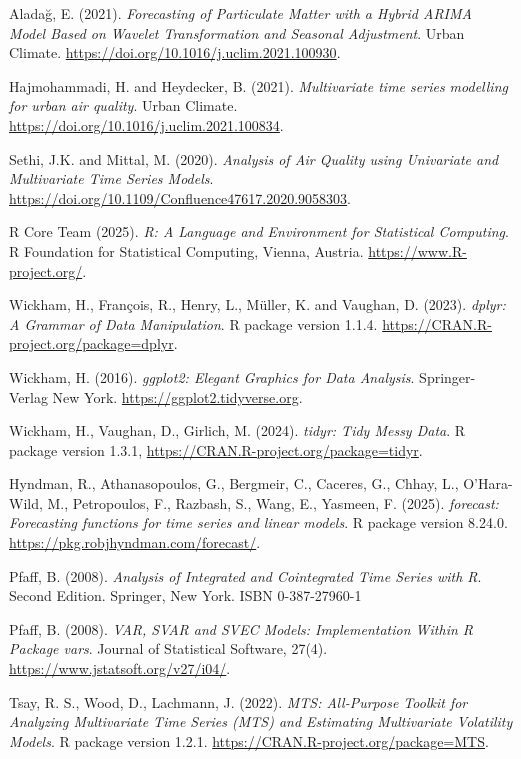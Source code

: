 \documentclass[fleqn,10pt]{SelfArx} %
\begin{document}
\begin{thebibliography}{9}

Aladağ, E. (2021). \textit{Forecasting of Particulate Matter with a Hybrid ARIMA Model Based on Wavelet Transformation and Seasonal Adjustment}. Urban Climate. \url{https://doi.org/10.1016/j.uclim.2021.100930}.

Hajmohammadi, H. and Heydecker, B. (2021). \textit{Multivariate time series modelling for urban air quality}. Urban Climate. \url{https://doi.org/10.1016/j.uclim.2021.100834}.

Sethi, J.K. and Mittal, M. (2020). \textit{Analysis of Air Quality using Univariate and Multivariate Time Series Models}. \url{https://doi.org/10.1109/Confluence47617.2020.9058303}.

R Core Team (2025). \textit{R: A Language and Environment for Statistical Computing}. R Foundation for Statistical Computing, Vienna, Austria. \url{https://www.R-project.org/}.

Wickham, H., François, R., Henry, L., Müller, K. and Vaughan, D. (2023). \textit{dplyr: A Grammar of Data Manipulation}. R package version 1.1.4. \url{https://CRAN.R-project.org/package=dplyr}.

Wickham, H. (2016). \textit{ggplot2: Elegant Graphics for Data Analysis}. Springer-Verlag New York. \url{https://ggplot2.tidyverse.org}.

Wickham, H., Vaughan, D., Girlich, M. (2024). \textit{tidyr: Tidy Messy Data}. R package version 1.3.1, \url{https://CRAN.R-project.org/package=tidyr}.

Hyndman, R., Athanasopoulos, G., Bergmeir, C., Caceres, G., Chhay, L., O'Hara-Wild, M., Petropoulos, F., Razbash, S., Wang, E., Yasmeen, F. (2025). \textit{forecast: Forecasting functions for time series and linear models}. R package version 8.24.0. \url{https://pkg.robjhyndman.com/forecast/}.

Pfaff, B. (2008). \textit{Analysis of Integrated and Cointegrated Time Series with R}. Second Edition. Springer, New York. ISBN 0-387-27960-1

Pfaff, B. (2008). \textit{VAR, SVAR and SVEC Models: Implementation Within R Package vars}. Journal of Statistical Software, 27(4). \url{https://www.jstatsoft.org/v27/i04/}.

Tsay, R. S., Wood, D., Lachmann, J. (2022). \textit{MTS: All-Purpose Toolkit for Analyzing Multivariate Time Series (MTS) and Estimating Multivariate Volatility Models}. R package version 1.2.1. \url{https://CRAN.R-project.org/package=MTS}.


\end{thebibliography}

\end{document}
